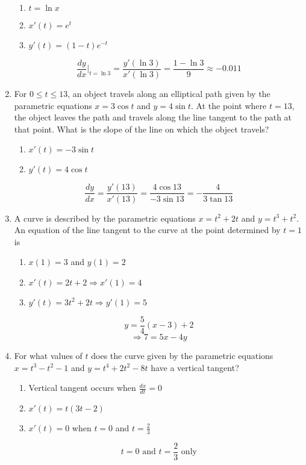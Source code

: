 \documentclass[12pt]{article}
\begin{document}
\begin{enumerate}
    \begin{enumerate}
        \item $t = \ln x$ 
        \item $x'(t) = e^t$
        \item $y'(t) = (1-t)e^{-t}$
    \end{enumerate}
    $$\frac{dy}{dx}\biggr\rvert_{t=\ln 3} = \frac{y'(\ln 3)}{x'(\ln 3)} = \frac{1-\ln 3}{9}\approx \boxed{-0.011}$$
    \item For $0 \leq t \leq 13$, an object travels along an elliptical path given by the parametric equations $x=3\cos t$ and $y=4\sin t$. At the point where $t=13$, the object leaves the path and travels along the line tangent to the path at that point. What is the slope of the line on which the object travels?
    \begin{enumerate}
        \item $x'(t) = -3\sin t$
        \item $y'(t) = 4 \cos t$
    \end{enumerate}
    $$\frac{dy}{dx} = \frac{y'(13)}{x'(13)}= \frac{4\cos 13}{-3 \sin 13} = \boxed{- \frac{4}{3 \tan 13}}$$
    \item A curve is described by the parametric equations $x = t^2 + 2t$ and $y = t^3 + t^2$. An equation of the line tangent to the curve at the point determined by $t = 1$ is
    \begin{enumerate}
        \item $x(1) = 3$ and $y(1) = 2$
        \item $x'(t) = 2t +2 \Longrightarrow x'(1)=4$
        \item $y'(t) = 3t^2+2t \Longrightarrow y'(1) = 5$ 
    \end{enumerate}
    $$y = \frac{5}{4}(x-3)+2$$
    $$\Longrightarrow \boxed{7 = 5x-4y}$$
    \item For what values of $t$ does the curve given by the parametric equations $x=t^3-t^2-1$ and $y=t^4+2t^2-8t$ have a vertical tangent?
    \begin{enumerate}
        \item Vertical tangent occurs when  $\frac{dx}{dt}= 0$
        \item $x'(t)= t(3t-2)$
        \item $x'(t) = 0$ when $t=0$ and $t= \frac{2}{3}$
    \end{enumerate}
$$\boxed{t=0 \text{ and } t= \frac{2}{3} \text{ only}}$$
\end{enumerate}
\end{document}
